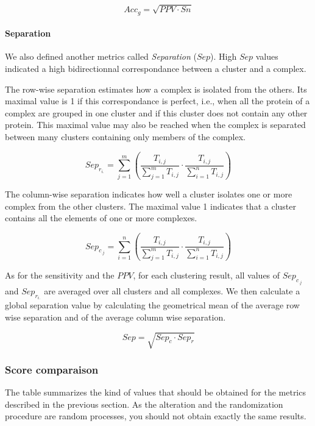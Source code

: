 \[Acc_g = \sqrt{PPV \cdot Sn}\]

\paragraph{Separation}

We also defined another metrics called \textit{Separation} ($Sep$). High $Sep$ values indicated a high bidirectionnal correspondance between a cluster and a complex.

The row-wise separation estimates how a complex is isolated from the others. Its maximal value is 1 if this correspondance is perfect, i.e., when all the protein of a complex are grouped in one cluster and if this cluster does not contain any other protein. This maximal value may also be reached when the complex is separated between many clusters containing only members of the complex.

\[Sep_{r_{i.}} = \sum_{j=1}^{m}{(\frac{T_{i,j}}{\sum_{j=1}^{m}{T_{i,j}}} \cdot \frac{T_{i,j}}{\sum_{i=1}^{n}{T_{i,j}}})}\]

The column-wise separation indicates how well a cluster isolates one or more complex from the other clusters. The maximal value 1 indicates that a cluster contains all the elements of one or more complexes.  

\[Sep_{c_{.j}} = \sum_{i=1}^{n}{(\frac{T_{i,j}}{\sum_{j=1}^{m}{T_{i,j}}} \cdot \frac{T_{i,j}}{\sum_{i=1}^{n}{T_{i,j}}})}\]

As for the sensitivity and the $PPV$, for each clustering result, all values of $Sep_{c_{.j}}$ and $Sep_{r_{i.}}$ are averaged over all clusters and all complexes. We then calculate a global separation value by calculating the geometrical mean of the average row wise separation and of the average column wise separation.

\[Sep = \sqrt{Sep_c \cdot Sep_r}\]


\subsubsection{Score comparaison}

The table summarizes the kind of values that should be obtained for the metrics described in the previous section. As the alteration and the randomization procedure are random processes, you should not obtain exactly the same results.

